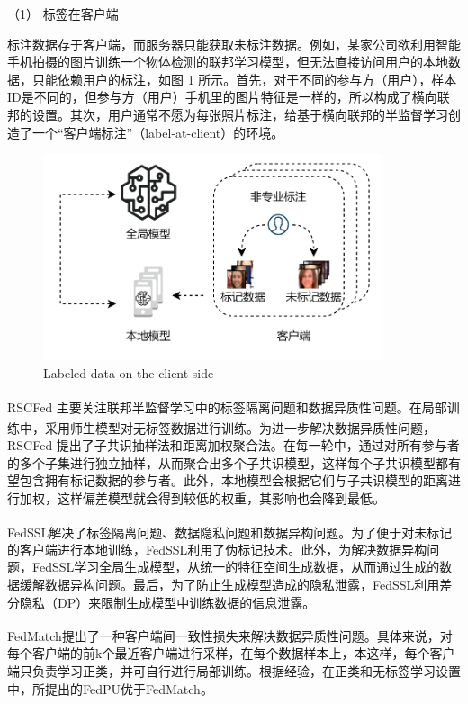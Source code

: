 （1） 标签在客户端

标注数据存于客户端，而服务器只能获取未标注数据。例如，某家公司欲利用智能手机拍摄的图片训练一个物体检测的联邦学习模型，但无法直接访问用户的本地数据，只能依赖用户的标注，如图 \ref{LabelAtClient} 所示。首先，对于不同的参与方（用户），样本ID是不同的，但参与方（用户）手机里的图片特征是一样的，所以构成了横向联邦的设置。其次，用户通常不愿为每张照片标注，给基于横向联邦的半监督学习创造了一个“客户端标注”（label-at-client）的环境。

\vspace{-0.1cm}
\begin{figure}[h]
	\centering
	\includegraphics[width=10cm]{chapters/imgs/LabelAtClient}
	{\wuhao Labeled data on the client side}
	\label{LabelAtClient}
\end{figure}
\vspace{-0.35cm}

RSCFed\textsuperscript{\cite{liang2022rscfed}} 主要关注联邦半监督学习中的标签隔离问题和数据异质性问题。在局部训练中，采用师生模型\textsuperscript{\cite{tarvainen2017mean}}对无标签数据进行训练。为进一步解决数据异质性问题，RSCFed 提出了子共识抽样法和距离加权聚合法。在每一轮中，通过对所有参与者的多个子集进行独立抽样，从而聚合出多个子共识模型，这样每个子共识模型都有望包含拥有标记数据的参与者。此外，本地模型会根据它们与子共识模型的距离进行加权，这样偏差模型就会得到较低的权重，其影响也会降到最低。

FedSSL\textsuperscript{\cite{fan2022private}}解决了标签隔离问题、数据隐私问题和数据异构问题。为了便于对未标记的客户端进行本地训练，FedSSL利用了伪标记技术。此外，为解决数据异构问题，FedSSL学习全局生成模型，从统一的特征空间生成数据，从而通过生成的数据缓解数据异构问题。最后，为了防止生成模型造成的隐私泄露，FedSSL利用差分隐私（DP）来限制生成模型中训练数据的信息泄露。

FedMatch\textsuperscript{\cite{jeong2020federated}}提出了一种客户端间一致性损失来解决数据异质性问题。具体来说，对每个客户端的前k个最近客户端进行采样，在每个数据样本上，本这样，每个客户端只负责学习正类，并可自行进行局部训练。根据经验，在正类和无标签学习设置中，所提出的FedPU优于FedMatch。

